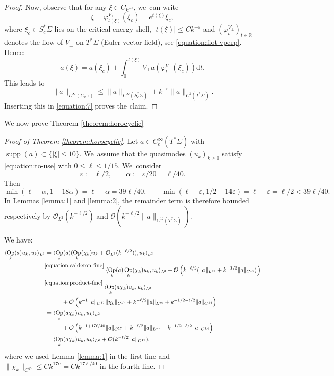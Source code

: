 \documentclass[JEP,XML,SOM,Unicode,published]{cedram}
\theoremstyle{plain}
\theoremstyle{definition}
\let\mc\mathcal
\newcommand{\R}{\mathbb{R}}
\let\eps\varepsilon
\newcommand{\dd}{\mathrm{d}}
\DeclareMathOperator{\comp}{c}
\DeclareMathOperator{\Op}{Op}
\DeclareMathOperator{\supp}{supp}
\begin{document}
\begin{proof}
Now, observe that for any $\xi \in C_{k^{-\eps}}$, we~can write
\[
\xi = \varphi_{t(\xi)}^{V_\perp}(\xi_c) = e^{t(\xi)}\xi_c,
\]
where $\xi_c \in S^*_c\Sigma$ lies on the critical energy shell, $|t(\xi)| \leq C k^{-\eps}$ and $(\varphi_t^{V_\perp})_{t \in \R}$ denotes the flow of $V_\perp$ on $T^*\Sigma$ (Euler vector field), see \eqref{equation:flot-vperp}. Hence:
\[
a(\xi) = a(\xi_c) + \int_0^{t(\xi)} V_\perp a(\varphi^{V_\perp}_t(\xi_c)) \dd t.
\]
This leads to
\[
\|a\|_{L^\infty(C_{k^{-\eps}})} \leq \|a\|_{L^\infty(S^*_c\Sigma)} + k^{-\eps}\|a\|_{C^1(T^*\Sigma)}.
\]
Inserting this in \eqref{equation:7} proves the claim.
\end{proof}

We now prove Theorem \ref{theorem:horocyclic}

\begin{proof}[Proof of Theorem \ref{theorem:horocyclic}]
Let $a \in C^\infty_{\comp}(T^*\Sigma)$ with $\supp(a) \subset \{|\xi| \leq 10\}$. We~assume that the quasimodes $(u_k)_{k \geq 0}$ satisfy \eqref{equation:to-use} with $0 \leq \ell \leq 1/15$. We~consider
\[
\eps := \ell/2, \qquad \alpha := \eps/20 = \ell/40.
\]
Then
\[
\min(\ell-\alpha,1-18\alpha) = \ell-\alpha = 39\ell/40, \qquad \min(\ell-\eps,1/2-14\eps)=\ell-\eps =\ell/2 < 39\ell/40.
\]
In Lemmas \ref{lemma:1} and \ref{lemma:2}, the remainder term is therefore bounded respectively by $\mc{O}_{L^2}(k^{-\ell/2})$ and $\mc{O}(k^{-\ell/2}\|a\|_{C^{17}(T^*\Sigma)})$.

We have:
\begin{align}
\langle \Op_k(a)u_k,u_k\rangle_{L^2}
&= \langle \Op_k(a)(\Op_k(\chi_k) u_k + \mc{O}_{L^2}(k^{-\ell/2})),u_k\rangle_{L^2} \notag\\
& \mkern-7mu\overset{\eqref{equation:calderon-fine}}{=} \langle \Op_k(a)\Op_k(\chi_k) u_k,u_k\rangle_{L^2} + \mc{O}\left(k^{-\ell/2}(\|a\|_{L^\infty} + k^{-1/2}\|a\|_{C^{14}})\right) \notag\\
& \mkern-7mu\overset{\eqref{equation:product-fine}}{=} \langle \Op_k(a \chi_k) u_k,u_k\rangle_{L^2} \notag\\
& \hspace{1cm}+ \mc{O}\left(k^{-1}\|a\|_{C^{17}}\|\chi_k\|_{C^{17}} + k^{-\ell/2}\|a\|_{L^\infty} + k^{-1/2-\ell/2}\|a\|_{C^{14}}\right)\label{equation:la1} \\
& = \langle \Op_k(a \chi_k) u_k,u_k\rangle_{L^2} \notag\\
& \hspace{1cm}+ \mc{O}\left(k^{-1+17\ell/40}\|a\|_{C^{17}} + k^{-\ell/2}\|a\|_{L^\infty} + k^{-1/2-\ell/2}\|a\|_{C^{14}}\right) \notag\\
& = \langle \Op_k(a \chi_k) u_k,u_k\rangle_{L^2} + \mc{O}(k^{-\ell/2}\|a\|_{C^{17}}),\notag
\end{align}
where we used Lemma \ref{lemma:1} in the first line and $\|\chi_k\|_{C^{17}} \leq C k^{17\alpha} = Ck^{17\ell/40}$ in the fourth line.


\end{proof}
\end{document}
